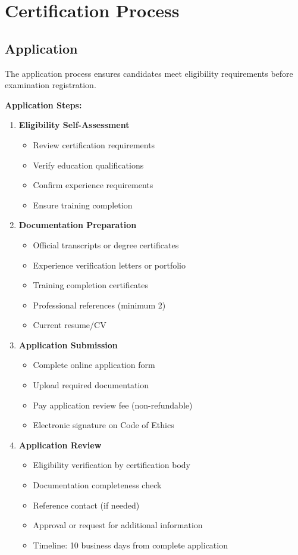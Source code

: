 \documentclass[11pt,a4paper]{article}
\begin{document}
\section{Certification Process}

\subsection{Application}

The application process ensures candidates meet eligibility requirements before examination registration.

\textbf{Application Steps:}

\begin{enumerate}
\item \textbf{Eligibility Self-Assessment}
\begin{itemize}
\item Review certification requirements
\item Verify education qualifications
\item Confirm experience requirements
\item Ensure training completion
\end{itemize}

\item \textbf{Documentation Preparation}
\begin{itemize}
\item Official transcripts or degree certificates
\item Experience verification letters or portfolio
\item Training completion certificates
\item Professional references (minimum 2)
\item Current resume/CV
\end{itemize}

\item \textbf{Application Submission}
\begin{itemize}
\item Complete online application form
\item Upload required documentation
\item Pay application review fee (non-refundable)
\item Electronic signature on Code of Ethics
\end{itemize}

\item \textbf{Application Review}
\begin{itemize}
\item Eligibility verification by certification body
\item Documentation completeness check
\item Reference contact (if needed)
\item Approval or request for additional information
\item Timeline: 10 business days from complete application
\end{itemize}
\end{enumerate}
\end{document}
